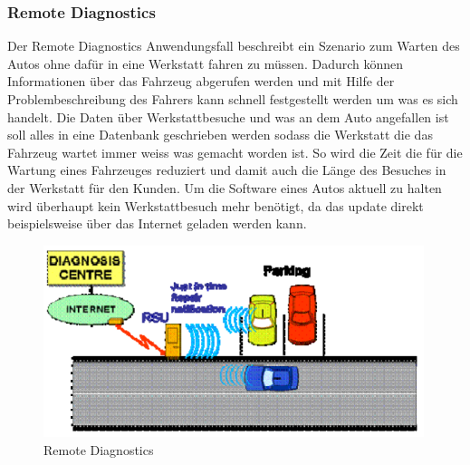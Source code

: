 \subsubsection{Remote Diagnostics}
Der Remote Diagnostics Anwendungsfall beschreibt ein Szenario zum Warten des Autos ohne dafür in eine Werkstatt fahren zu müssen. Dadurch können Informationen über das Fahrzeug abgerufen werden und mit Hilfe der Problembeschreibung des Fahrers kann schnell festgestellt werden um was es sich handelt. Die Daten über Werkstattbesuche und was an dem Auto angefallen ist soll alles in eine Datenbank geschrieben werden sodass die Werkstatt die das Fahrzeug wartet immer weiss was gemacht worden ist. So wird die Zeit die für die Wartung eines Fahrzeuges reduziert und damit auch die Länge des Besuches in der Werkstatt für den Kunden. Um die Software eines Autos aktuell zu halten wird überhaupt kein Werkstattbesuch mehr benötigt, da das update direkt beispielsweise über das Internet geladen werden kann.
\begin{figure}[htbp]
\includegraphics[width=0.99\textwidth]{content/images/06_use_cases/rds.png}
\caption{Remote Diagnostics\cite{etsi102638}}
\label{fig:redia}
\end{figure}

